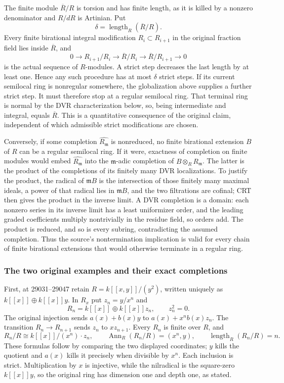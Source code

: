 The finite module \(\overline R/R\) is torsion and has finite length, as it is killed by a nonzero denominator and \(R/dR\) is Artinian. Put \[
 \delta=\operatorname{length}_R(\overline R/R).
\] Every finite birational integral modification \(R_i\subset R_{i+1}\) in the original fraction field lies inside \(\overline R\), and \[
 0\longrightarrow R_{i+1}/R_i
 \longrightarrow \overline R/R_i
 \longrightarrow \overline R/R_{i+1}
 \longrightarrow0
\] is the actual sequence of \(R\)-modules. A strict step decreases the last length by at least one. Hence any such procedure has at most \(\delta\) strict steps. If its current semilocal ring is nonregular somewhere, the globalization above supplies a further strict step. It must therefore stop at a regular semilocal ring. That terminal ring is normal by the DVR characterization below, so, being intermediate and integral, equals \(\overline R\). This is a quantitative consequence of the original claim, independent of which admissible strict modifications are chosen.

Conversely, if some completion \(\widehat{R_{\mathfrak m}}\) is nonreduced, no finite birational extension \(B\) of \(R\) can be a regular semilocal ring. If it were, exactness of completion on finite modules would embed \(\widehat{R_{\mathfrak m}}\) into the \(\mathfrak m\)-adic completion of \(B\otimes_R R_{\mathfrak m}\). The latter is the product of the completions of its finitely many DVR localizations. To justify the product, the radical of \(\mathfrak m B\) is the intersection of those finitely many maximal ideals, a power of that radical lies in \(\mathfrak mB\), and the two filtrations are cofinal; CRT then gives the product in the inverse limit. A DVR completion is a domain: each nonzero series in its inverse limit has a least uniformizer order, and the leading graded coefficients multiply nontrivially in the residue field, so orders add. The product is reduced, and so is every subring, contradicting the assumed completion. Thus the source's nontermination implication is valid for every chain of finite birational extensions that would otherwise terminate in a regular ring.

\subsubsection{The two original examples and their exact completions}\label{the-two-original-examples-and-their-exact-completions}

First, at 29031--29047 retain \(R=k[[x,y]]/(y^2)\), written uniquely as \(k[[x]]\oplus k[[x]]y\). In \(R_x\) put \(z_n=y/x^n\) and \[
 R_n=k[[x]]\oplus k[[x]]z_n,\qquad z_n^2=0.
\] The original injection sends \(a(x)+b(x)y\) to \(a(x)+x^nb(x)z_n\). The transition \(R_n\to R_{n+1}\) sends \(z_n\) to \(xz_{n+1}\). Every \(R_n\) is finite over \(R\), and \[
 R_n/R\cong k[[x]]/(x^n)\cdot z_n,\qquad
 \operatorname{Ann}_R(R_n/R)=(x^n,y),\qquad
 \operatorname{length}_R(R_n/R)=n.
\] These formulas follow by comparing the two displayed coordinates; \(y\) kills the quotient and \(a(x)\) kills it precisely when divisible by \(x^n\). Each inclusion is strict. Multiplication by \(x\) is injective, while the nilradical is the square-zero \(k[[x]]y\), so the original ring has dimension one and depth one, as stated.

